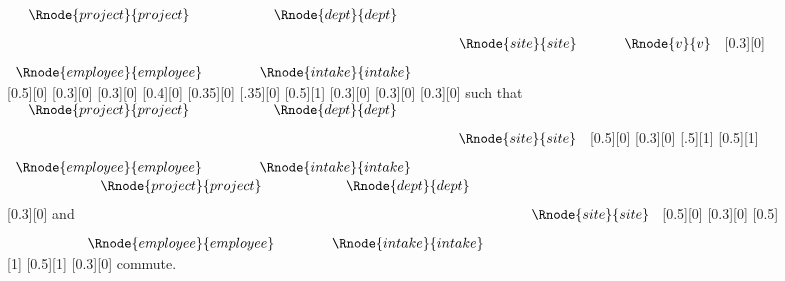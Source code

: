 \begin{figure} [h]  %
\begin{center}
$
\begin{array}{c p{0.75cm}c p{0.5cm}c p{0.5cm}c}
 \Rnode{project}{project}  && \Rnode{dept}{dept}  &&              &&              \\ [0.3cm]
	 	           &&               && \Rnode{site}{site} && \Rnode{v}{v} \\ [0.3cm]     
 \Rnode{employee}{employee}  && \Rnode{intake}{intake}  &&              &&              \\ 
\end{array}
$
[0.3][0]
\idcomp
{} 
[0.5][0]
[0.3][0]
\idcomp
{} 
[0.3][0]
\idcomp
{}
[0.4][0]
\idcomp
{}
[0.35][0]
[.35][0]
[0.5][1]
[0.3][0]
\idcomp
{}
[0.3][0]
\idcomp
{}
[0.3][0]
\idcomp
\vspace{1.5cm}
\newline
such that \hspace{0.5cm}
$
\begin{array}{c p{0.75cm}c p{0.5cm}c}
 \Rnode{project}{project}  && \Rnode{dept}{dept}  &&              \\ [0.3cm]
	 	           &&               && \Rnode{site}{site}  \\ [0.3cm]     
 \Rnode{employee}{employee}  && \Rnode{intake}{intake}  &&              \\ 
\end{array}
$
[0.5][0]
[0.3][0]
\idcomp
{}
[.5][1]
[0.5][1]
[0.3][0]
\idcomp
\hspace {0.25cm} and \hspace{0.5cm}
$
\begin{array}{c p{0.75cm}c p{0.5cm}c}
 \Rnode{project}{project}  && \Rnode{dept}{dept}  &&              \\ [0.3cm]
	 	           &&               && \Rnode{site}{site}  \\ [0.3cm]     
 \Rnode{employee}{employee}  && \Rnode{intake}{intake}  &&               \\ 
\end{array}
$
[0.5][0]
[0.3][0]
\idcomp
{}
[0.5][1]
[0.5][1]
[0.3][0]
\idcomp
\hspace{0.2cm} commute.


\end{center}
\end{figure}
